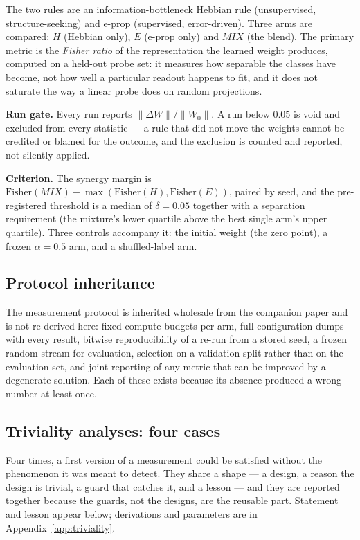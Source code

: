 \documentclass[11pt]{article}
\begin{document}
The two rules are an information-bottleneck Hebbian rule \citep{pogodin2020kernelized}
(unsupervised, structure-seeking) and e-prop \citep{bellec2020eprop} (supervised, error-driven). Three arms are compared: $H$ (Hebbian only), $E$ (e-prop only)
and $MIX$ (the blend). The primary metric is the \emph{Fisher ratio} of the representation the
learned weight produces, computed on a held-out probe set: it measures how separable the classes
have become, not how well a particular readout happens to fit, and it does not saturate the way a
linear probe does on random projections.

\textbf{Run gate.} Every run reports $\|\Delta W\| / \|W_0\|$. A run below $0.05$ is void and
excluded from every statistic --- a rule that did not move the weights cannot be credited or blamed
for the outcome, and the exclusion is counted and reported, not silently applied.

\textbf{Criterion.} The synergy margin is $\mathrm{Fisher}(MIX) - \max(\mathrm{Fisher}(H),
\mathrm{Fisher}(E))$, paired by seed, and the pre-registered threshold is a median of
$\delta = 0.05$ together with a separation requirement (the mixture's lower quartile above the
best single arm's upper quartile). Three controls accompany it: the initial weight (the zero
point), a frozen $\alpha = 0.5$ arm, and a shuffled-label arm.

\subsection{Protocol inheritance}

The measurement protocol is inherited wholesale from the companion paper
\citep{biosnnplug2026} and is not re-derived here: fixed compute budgets per arm, full configuration dumps with every result, bitwise
reproducibility of a re-run from a stored seed, a frozen random stream for evaluation, selection
on a validation split rather than on the evaluation set, and joint reporting of any metric that can
be improved by a degenerate solution. Each of these exists because its absence produced a wrong
number at least once.

\subsection{Triviality analyses: four cases}\label{sec:triviality}

Four times, a first version of a measurement could be satisfied without the phenomenon it was
meant to detect. They share a shape --- a design, a reason the design is trivial, a guard that
catches it, and a lesson --- and they are reported together because the guards, not the designs,
are the reusable part. Statement and lesson appear below; derivations and parameters are in
Appendix~\ref{app:triviality}.
\end{document}
